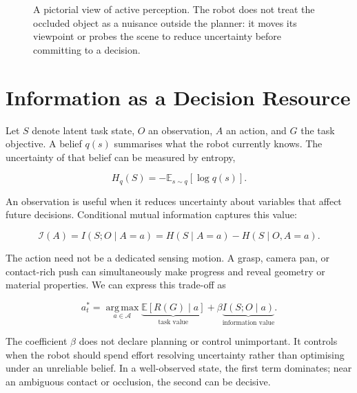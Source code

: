 \documentclass[11pt]{article}
\begin{document}
\begin{figure}[ht]
\caption{A pictorial view of active perception. The robot does not treat the
occluded object as a nuisance outside the planner: it moves its viewpoint or
probes the scene to reduce uncertainty before committing to a decision.}
\label{fig:robot-scene}
\end{figure}

\section{Information as a Decision Resource}
\label{sec:information}

Let $S$ denote latent task state, $O$ an observation, $A$ an action, and $G$
the task objective. A belief $q(s)$ summarises what the robot currently knows.
The uncertainty of that belief can be measured by entropy,

\begin{equation}
  H_q(S) = -\mathbb{E}_{s\sim q}\left[\log q(s)\right].
  \label{eq:entropy}
\end{equation}

An observation is useful when it reduces uncertainty about variables that affect
future decisions. Conditional mutual information captures this value:

\begin{equation}
  \mathcal{I}(A) = I(S;O\mid A=a)
  = H(S\mid A=a) - H(S\mid O,A=a).
  \label{eq:mutual-information}
\end{equation}

The action need not be a dedicated sensing motion. A grasp, camera pan, or
contact-rich push can simultaneously make progress and reveal geometry or
material properties. We can express this trade-off as

\begin{equation}
  a_t^* = \operatorname*{arg\,max}_{a\in\mathcal{A}}
  \underbrace{\mathbb{E}[R(G)\mid a]}_{\text{task value}}
  + \beta\underbrace{I(S;O\mid a)}_{\text{information value}}.
  \label{eq:active-action}
\end{equation}

The coefficient $\beta$ does not declare planning or control unimportant. It
controls when the robot should spend effort resolving uncertainty rather than
optimising under an unreliable belief. In a well-observed state, the first term
dominates; near an ambiguous contact or occlusion, the second can be decisive.
\end{document}

